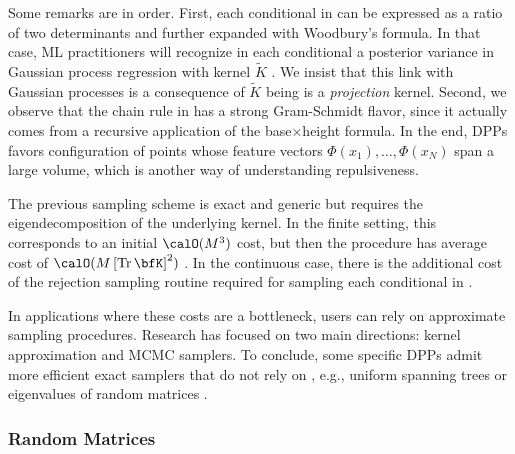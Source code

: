 \documentclass[twoside,11pt]{article}
\begin{document}
      Some remarks are in order.
      First, each conditional in  can be expressed as a ratio of two determinants and further expanded with Woodbury's formula.
      In that case, ML practitioners will recognize in each conditional a posterior variance in Gaussian process regression with kernel $\tilde K$ \cite[Equation 2.26]{RaWi06}. We insist that this link with Gaussian processes is a consequence of $\tilde K$ being is a \emph{projection} kernel.
      Second, we observe that the chain rule in  has a strong Gram-Schmidt flavor, since it actually comes from a recursive application of the base$\times$height formula.
      In the end, DPPs favors configuration of points whose feature vectors $\Phi(x_1),\dots, \Phi(x_N)$ span a large volume, which is another way of understanding repulsiveness.

      The previous sampling scheme is exact and generic but requires the eigendecomposition of the underlying kernel.
      In the finite setting, this corresponds to an initial $\calO(M^3)$ cost, but then the procedure has average cost of $\calO(M\lrb{\Tr \bfK}^2)$
      \citep{TrBaAm18}.
      In the continuous case, there is the additional cost of the rejection sampling routine required for sampling each conditional in .

      In applications where these costs are a bottleneck, users can rely on approximate sampling procedures. Research has focused on two main directions: kernel approximation and MCMC samplers. To conclude, some specific DPPs admit more efficient exact samplers that do not rely on , e.g., uniform spanning trees \citep{PrWi98} or eigenvalues of random matrices \citep{DuEd02}.


    \subsubsection{Random Matrices} %
    \label{ssub:random_matrices}
\end{document}
